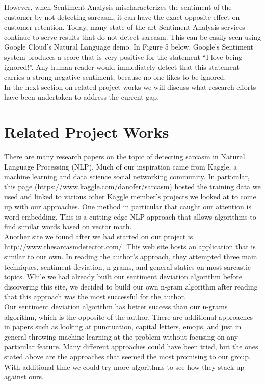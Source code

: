 \documentclass[conference]{IEEEtran}
\begin{document}
However, when Sentiment Analysis mischaracterizes the sentiment of the customer by not detecting sarcasm, it can have the exact opposite effect on customer retention. Today, many state-of-the-art Sentiment Analysis services continue to serve results that do not detect sarcasm. This can be easily seen using Google Cloud’s Natural Language demo. In Figure 5 below, Google’s Sentiment system produces a score that is very positive for the statement “I love being ignored!”. Any human reader would immediately detect that this statement carries a strong negative sentiment, because no one likes to be ignored. \\
In the next section on related project works we will discuss what research efforts have been undertaken to address the current gap.\\

\section{Related Project Works}
There are many research papers on the topic of detecting sarcasm in Natural Language Processing (NLP). Much of our inspiration came from Kaggle, a machine learning and data science social networking community. In particular, this page (https://www.kaggle.com/danofer/sarcasm) hosted the training data we used and linked to various other Kaggle member’s projects we looked at to come up with our approaches. One method in particular that caught our attention is word-embedding. This is a cutting edge NLP approach that allows algorithms to find similar words based on vector math. \\
Another site we found after we had started on our project is http://www.thesarcasmdetector.com/. This web site hosts an application that is similar to our own. In reading the author's approach, they attempted three main techniques, sentiment deviation, n-grams, and general statics on most sarcastic topics. While we had already built our sentiment deviation algorithm before discovering this site, we decided to build our own n-gram algorithm after reading that this approach was the most successful for the author.\\
Our sentiment deviation algorithm has better success than our n-grams algorithm, which is the opposite of the author. There are additional approaches in papers such as looking at punctuation, capital letters, emojis, and just in general throwing machine learning at the problem without focusing on any particular feature. Many different approaches could have been tried, but the ones stated above are the approaches that seemed the most promising to our group. With additional time we could try more algorithms to see how they stack up against ours.\\
\end{document}
